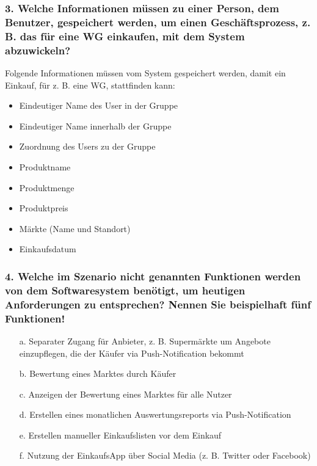 \documentclass[12pt,a4paper]{article}
\begin{document}
\subsubsection*{3. Welche Informationen müssen zu einer Person, dem Benutzer, gespeichert werden, um einen Geschäftsprozess, z. B. das für eine WG einkaufen, mit dem System abzuwickeln?}
Folgende Informationen müssen vom System gespeichert werden, damit ein Einkauf, für z. B. eine WG, stattfinden kann:
\begin{itemize} 
\item Eindeutiger Name des User in der Gruppe %
\item Eindeutiger Name innerhalb der Gruppe %
\item Zuordnung des Users zu der Gruppe %
\item Produktname
\item Produktmenge
\item Produktpreis
\item Märkte (Name und Standort)
\item Einkaufsdatum
\end{itemize}
\subsubsection*{4. Welche im Szenario nicht genannten Funktionen werden von dem Softwaresystem benötigt, um heutigen Anforderungen zu entsprechen? Nennen Sie beispielhaft fünf Funktionen!}
\begin{itemize}
\item[a.] Separater Zugang für Anbieter, z. B. Supermärkte um Angebote einzupflegen, die der Käufer via Push-Notification bekommt
\item[b.] Bewertung eines Marktes durch Käufer
\item[c.] Anzeigen der Bewertung eines Marktes für alle Nutzer
\item[d.] Erstellen eines monatlichen Auswertungsreports via Push-Notification 
\item[e.] Erstellen manueller Einkaufslisten vor dem Einkauf 
\item[f.] Nutzung der EinkaufsApp über Social Media (z. B. Twitter oder Facebook)
\end{itemize} 
\end{document}
